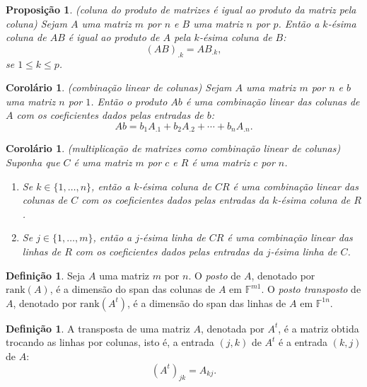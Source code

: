\documentclass[12pt]{article}
\theoremstyle{plain}
\newtheorem{prop}[thm]{Proposição}
\newtheorem{cor}[thm]{Corolário}
\theoremstyle{definition}
\newtheorem{defn}[thm]{Definição}
\theoremstyle{remark}
\begin{document}
\begin{prop} (coluna do produto de matrizes é igual ao produto da matriz pela coluna)
    Sejam \(A\) uma matriz \(m\) por \(n\) e \(B\) uma matriz \(n\) por \(p\). Então a \(k\)-ésima coluna de \(AB\) é igual ao produto de \(A\) pela \(k\)-ésima coluna de \(B\):
    \[
        (AB)_{.k} = A B_{.k},
    \]
    \noindent se \(1 \leq k \leq p\).
\end{prop}

\begin{cor} (combinação linear de colunas)
    Sejam \(A\) uma matriz \(m\) por \(n\) e \(b\) uma matriz \(n\) por \(1\). Então o produto \(Ab\) é uma combinação linear das colunas de \(A\) com os coeficientes dados pelas entradas de \(b\):
    \[
        Ab = b_1 A_{.1} + b_2 A_{.2} + \cdots + b_n A_{.n}.
    \]
\end{cor}

\begin{cor} (multiplicação de matrizes como combinação linear de colunas)
    Suponha que \(C\) é uma matriz \(m\) por \(c\) e \(R\) é uma matriz \(c\) por \(n\).
    \begin{enumerate}
        \item[\textup{(a)}] Se \(k \in \{1, \ldots, n\}\), então a \(k\)-ésima coluna de \(CR\) é uma combinação linear das colunas de \(C\) com os coeficientes dados pelas entradas da \(k\)-ésima coluna de \(R\).
        \item[\textup{(b)}] Se \(j \in \{1, \ldots, m\}\), então a \(j\)-ésima linha de \(CR\) é uma combinação linear das linhas de \(R\) com os coeficientes dados pelas entradas da \(j\)-ésima linha de \(C\).
    \end{enumerate}
\end{cor}

\begin{defn}
    Seja \(A\) uma matriz \(m\) por \(n\). O \emph{posto} de \(A\), denotado por \(\text{rank}(A)\), é a dimensão do span das colunas de \(A\) em \(\mathbb{F}^{m1}\). O \emph{posto transposto} de \(A\), denotado por \(\text{rank}(A^t)\), é a dimensão do span das linhas de \(A\) em \(\mathbb{F}^{1n}\).
\end{defn}

\begin{defn}
    A transposta de uma matriz \(A\), denotada por \(A^t\), é a matriz obtida trocando as linhas por colunas, isto é, a entrada \((j, k)\) de \(A^t\) é a entrada \((k, j)\) de \(A\):
    \[
        (A^t)_{jk} = A_{kj}.
    \]
\end{defn}
\end{document}
